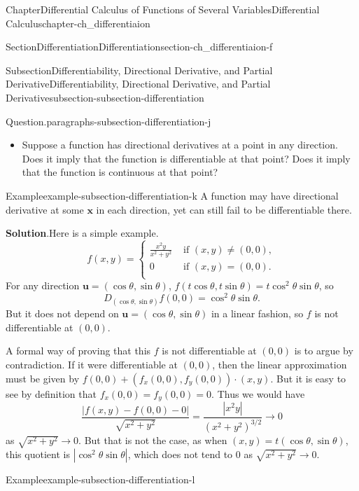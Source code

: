 \documentclass[oneside,10pt,]{book}
\newcommand{\blocktitlefont}{\relax}
\numberwithin{equation}{section}
\newcommand{\amp}{&}
\begin{document}
\begin{chapterptx}{Chapter}{Differential Calculus of Functions of Several Variables}{}{Differential Calculus}{}{}{chapter-ch_differentiaion}
\begin{sectionptx}{Section}{Differentiation}{}{Differentiation}{}{}{section-ch_differentiaion-f}
\begin{subsectionptx}{Subsection}{Differentiability, Directional Derivative, and Partial Derivative}{}{Differentiability, Directional Derivative, and Partial Derivative}{}{}{subsection-subsection-differentiation}
\begin{paragraphs}{Question.}{paragraphs-subsection-differentiation-j}
\begin{itemize}[label=\textbullet]
\item{}Suppose a function has directional derivatives at a point in any direction. Does it imply that the function is differentiable at that point? Does it imply that the function is continuous at that point?%
\end{itemize}
\end{paragraphs}%
\begin{example}{Example}{}{example-subsection-differentiation-k}%
A function may have directional derivative at some \({\mathbf x}\)  in each direction, yet can still fail to be differentiable there.\par\smallskip%
\noindent\textbf{\blocktitlefont Solution}.\hypertarget{solution-subsection-differentiation-k-c}{}\quad{}Here is a simple example.%
\begin{equation*}
f(x, y)=\begin{cases} \frac{x^{2}y}{x^{2}+y^{2}} \amp\text{ if } (x, y)\ne (0, 0),\\
0 \amp\text{ if } (x, y)= (0, 0).\\
\end{cases}
\end{equation*}
For any direction \({\mathbf u}=(\cos\theta, \sin\theta)\), \(f(t\cos\theta, t\sin\theta)=t \cos^{2}\theta \sin\theta\), so%
\begin{equation*}
D_{(\cos\theta, \sin\theta)}f(0,0)= \cos^{2}\theta \sin\theta\text{.}
\end{equation*}
But it does not depend on \({\mathbf u}=(\cos\theta, \sin\theta)\) in a linear fashion, so \(f\) is not differentiable at \((0, 0)\).%
\par
A formal way of proving that this \(f\) is not differentiable at \((0, 0)\) is to argue by contradiction. If it were differentiable at \((0, 0)\), then the linear approximation must be given by \(f(0,0)+(f_{x}(0, 0), f_{y}(0, 0))\cdot (x, y)\). But it is easy to see by definition that \(f_{x}(0, 0)= f_{y}(0, 0)=0\). Thus we would have%
\begin{equation*}
\frac{|f(x, y)-f(0, 0) -0|}{\sqrt{x^{2}+y^{2}}} =\frac{|x^{2}y|}{(x^{2}+y^{2})^{3/2}}\to 0
\end{equation*}
as \(\sqrt{x^{2}+y^{2}}\to 0\). But that is not the case, as when \((x, y)=t(\cos\theta, \sin\theta)\), this quotient is \(|\cos^{2}\theta \sin\theta|\), which does not tend to \(0\) as \(\sqrt{x^{2}+y^{2}}\to 0\).%
\end{example}
\begin{example}{Example}{}{example-subsection-differentiation-l}%

\end{example}
\end{subsectionptx}
\end{sectionptx}
\end{chapterptx}
\end{document}
